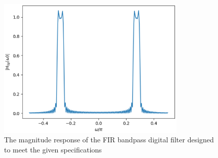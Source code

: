 \documentclass[journal,12pt,twocolumn]{IEEEtran}
\begin{document}
\begin{figure}
    \centering
    \includegraphics[width = 9cm]{./figs/fir/ee18btech11035_fir_bp.eps}
    \caption{The magnitude response of the FIR bandpass digital filter designed to meet the given specifications}
    \label{fig:fir_bandpass}
\end{figure}
\end{document}
